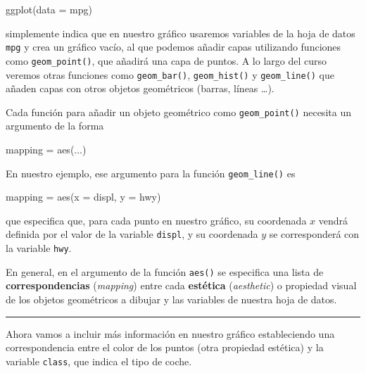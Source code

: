 \documentclass[
  title=normal,
  notoc,
  bib=normal]{mnye}
\newenvironment{Shaded}{\begin{snugshade}}{\end{snugshade}}
\newcommand{\AttributeTok}[1]{\textcolor[rgb]{0.77,0.63,0.00}{#1}}
\newcommand{\FunctionTok}[1]{\textcolor[rgb]{0.00,0.00,0.00}{#1}}
\newcommand{\NormalTok}[1]{#1}
\newcommand{\OtherTok}[1]{\textcolor[rgb]{0.56,0.35,0.01}{#1}}
\begin{document}
\begin{Shaded}
\begin{Highlighting}[]
\FunctionTok{ggplot}\NormalTok{(}\AttributeTok{data =}\NormalTok{ mpg)}
\end{Highlighting}
\end{Shaded}

simplemente indica que en nuestro gráfico usaremos variables de la hoja de datos \texttt{mpg} y crea un gráfico vacío, al que podemos añadir capas utilizando funciones como \texttt{geom\_point()}, que añadirá una capa de puntos. A lo largo del curso veremos otras funciones como \texttt{geom\_bar()}, \texttt{geom\_hist()} y \texttt{geom\_line()} que añaden capas con otros objetos geométricos (barras, líneas \ldots).

Cada función para añadir un objeto geométrico como \texttt{geom\_point()} necesita un argumento de la forma

\begin{Shaded}
\begin{Highlighting}[]
\NormalTok{mapping }\OtherTok{=} \FunctionTok{aes}\NormalTok{(...)}
\end{Highlighting}
\end{Shaded}

En nuestro ejemplo, ese argumento para la función \texttt{geom\_line()} es

\begin{Shaded}
\begin{Highlighting}[]
\NormalTok{mapping }\OtherTok{=} \FunctionTok{aes}\NormalTok{(}\AttributeTok{x =}\NormalTok{ displ, }\AttributeTok{y =}\NormalTok{ hwy)}
\end{Highlighting}
\end{Shaded}

que especifica que, para cada punto en nuestro gráfico, su coordenada \(x\) vendrá definida por el valor de la variable \texttt{displ}, y su coordenada \(y\) se corresponderá con la variable \texttt{hwy}.

En general, en el argumento de la función \texttt{aes()} se especifica una lista de \textbf{correspondencias} (\emph{mapping}) entre cada \textbf{estética} (\emph{aesthetic}) o propiedad visual de los objetos geométricos a dibujar y las variables de nuestra hoja de datos.

\begin{center}\rule{0.5\linewidth}{0.5pt}\end{center}

Ahora vamos a incluir más información en nuestro gráfico estableciendo una correspondencia entre el color de los puntos (otra propiedad estética) y la variable \texttt{class}, que indica el tipo de coche.
\end{document}

